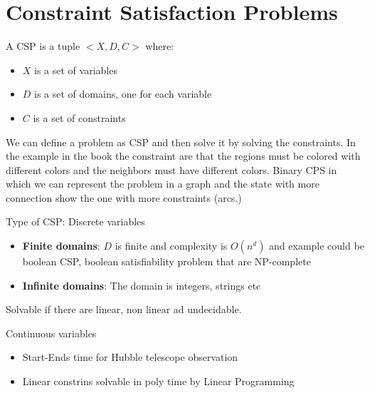 \documentclass[12pt]{book}
\begin{document}

\section{Constraint Satisfaction Problems}

A CSP is a tuple $<X, D, C>$ where: \newline

\begin{itemize}
	\item $X$ is a set of variables
	\item $D$ is a set of domains, one for each variable
	\item $C$ is a set of constraints
\end{itemize}

We can define a problem as CSP and then solve it by solving the constraints.
In the example in the book the constraint are that the regions must be colored with different colors and the neighbors must have different colors.
Binary CPS in which we can represent the problem in a graph and the state with more connection show the one with more constraints (arcs.) \newline

Type of CSP: Discrete variables \newline
\begin{itemize}
	\item \textbf{Finite domains}: $D$ is finite and complexity is $O(n^d)$ and example could be boolean CSP, boolean satisfiability problem that are NP-complete
	\item \textbf{Infinite domains}: The domain is integers, strings etc
\end{itemize}
Solvable if there are linear, non linear ad undecidable.

Continuous variables \newline
\begin{itemize}
	\item Start-Ends time for Hubble telescope observation
	\item Linear constrins solvable in poly time by Linear Programming
\end{itemize}
\end{document}
